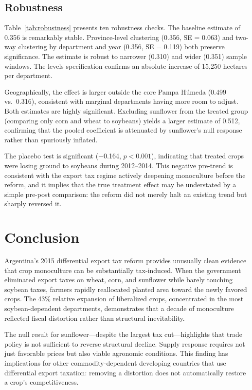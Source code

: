 \documentclass[12pt]{article}
\begin{document}
\subsection{Robustness}



Table~\ref{tab:robustness} presents ten robustness checks. The baseline estimate of 0.356 is remarkably stable. Province-level clustering (0.356, SE = 0.063) and two-way clustering by department and year (0.356, SE = 0.119) both preserve significance. The estimate is robust to narrower (0.310) and wider (0.351) sample windows. The levels specification confirms an absolute increase of 15,250 hectares per department.

Geographically, the effect is larger outside the core Pampa H\'{u}meda (0.499 vs.\ 0.316), consistent with marginal departments having more room to adjust. Both estimates are highly significant. Excluding sunflower from the treated group (comparing only corn and wheat to soybeans) yields a larger estimate of 0.512, confirming that the pooled coefficient is attenuated by sunflower's null response rather than spuriously inflated.

The placebo test is significant ($-$0.164, $p < 0.001$), indicating that treated crops were losing ground to soybeans during 2012--2014. This negative pre-trend is consistent with the export tax regime actively deepening monoculture before the reform, and it implies that the true treatment effect may be understated by a simple pre-post comparison: the reform did not merely halt an existing trend but sharply reversed it.


\section{Conclusion}
\label{sec:conclusion}

Argentina's 2015 differential export tax reform provides unusually clean evidence that crop monoculture can be substantially tax-induced. When the government eliminated export taxes on wheat, corn, and sunflower while barely touching soybean taxes, farmers rapidly reallocated planted area toward the newly favored crops. The 43\% relative expansion of liberalized crops, concentrated in the most soybean-dependent departments, demonstrates that a decade of monoculture reflected fiscal distortion rather than structural inevitability.

The null result for sunflower---despite the largest tax cut---highlights that trade policy is not sufficient to reverse structural decline. Supply response requires not just favorable prices but also viable agronomic conditions. This finding has implications for other commodity-dependent developing countries that use differential export taxation: removing a distortion does not automatically restore a crop's competitiveness.
\end{document}
